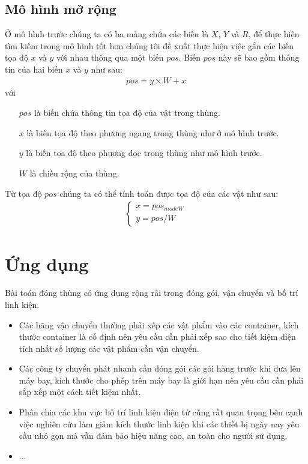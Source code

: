 \subsection*{Mô hình mở rộng}
Ở mô hình trước chúng ta có ba mảng chứa các biến là $X$, $Y$ và $R$, để thực hiện tìm kiếm trong mô hình tốt hơn chúng tôi đề xuất thực hiện việc gắn các biến tọa độ $x$ và $y$ với nhau thông qua một biến $pos$. Biến $pos$ này sẽ bao gồm thông tin của hai biến $x$ và $y$ như sau:
\begin{align}
	pos = y \times W + x
\end{align}
với 
\begin{itemize}
	\item[$pos$] là biến chứa thông tin tọa độ của vật trong thùng.
	\item[$x$] là biến tọa độ theo phương ngang trong thùng như ở mô hình trước.
	\item[$y$] là biến tọa độ theo phương dọc trong thùng như mô hình trước.
	\item[$W$] là chiều rộng của thùng.
\end{itemize}
Từ tọa độ $pos$ chúng ta có thể tính toán được tọa độ của các vật như sau:
\begin{align}
	\begin{cases}
		x = pos _{mode W}\\
		y = pos / W
	\end{cases}
\end{align}
\section{Ứng dụng}
Bài toán đóng thùng có ứng dụng rộng rãi trong đóng gói, vận chuyển và bố trí linh kiện.
\begin{itemize}
	\item Các hãng vận chuyển thường phải xếp các vật phẩm vào các container, kích thước container là cố định nên yêu cầu cần phải xếp sao cho tiết kiệm diện tích nhất số lượng các vật phẩm cần vận chuyển.
	\item Các công ty chuyển phát nhanh cần đóng gói các gói hàng trước khi đưa lên máy bay, kích thước cho phép trên máy bay là giới hạn nên yêu cầu cần phải sắp xếp một cách tiết kiệm nhất.
	\item Phân chia các khu vực bố trí linh kiện điện tử cũng rất quan trọng bên cạnh việc nghiên cứu làm giảm kích thước linh kiện khi các thiết bị ngày nay yêu cầu nhỏ gọn mà vẫn đảm bảo hiệu năng cao, an toàn cho người sử dụng.
	\item $\dots$
\end{itemize}
